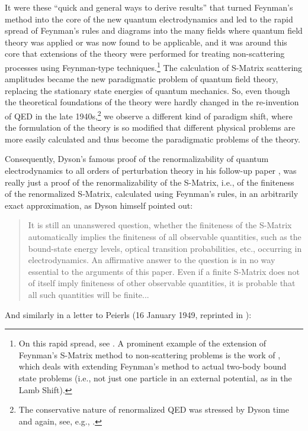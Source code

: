 \documentclass[12pt]{article}
\begin{document}
It were these ``quick and general ways to derive results'' that turned Feynman's method into the core of the new quantum electrodynamics and led to the rapid spread of Feynman's rules and diagrams into the many fields where quantum field theory was applied or was now found to be applicable, and it was around this core that extensions of the theory were performed for treating non-scattering processes using Feynman-type techniques.\footnote{On this rapid spread, see \citep{kaiser}. A prominent example of the extension of Feynman's S-Matrix method to non-scattering problems is the work of \cite{bethe_1951_a-relativistic}, which deals with extending Feynman's method to actual two-body bound state problems (i.e., not just one particle in an external potential, as in the Lamb Shift).} The calculation of S-Matrix scattering amplitudes became the new paradigmatic problem of quantum field theory, replacing the stationary state energies of quantum mechanics. So, even though the theoretical foundations of the theory were hardly changed in the re-invention of QED in the late 1940s,\footnote{The conservative nature of renormalized QED was stressed by Dyson time and again, see, e.g., \citep{dyson_1965_tomonaga}.} we observe a different kind of paradigm shift, where the formulation of the theory is so modified that different physical problems are more easily calculated and thus become the paradigmatic problems of the theory.

Consequently, Dyson's famous proof of the renormalizability of quantum electrodynamics to all orders of perturbation theory in his follow-up paper \citep{dyson_1949_the-s}, was really just a proof of the renormalizability of the S-Matrix, i.e., of the finiteness of the renormalized S-Matrix, calculated using Feynman's rules, in an arbitrarily exact approximation, as Dyson himself pointed out:

\begin{quote}
It is still an unanswered question, whether the finiteness of the S-Matrix automatically implies the finiteness of all observable quantities, such as the bound-state energy levels, optical transition probabilities, etc., occurring in electrodynamics. An affirmative answer to the question is in no way essential to the arguments of this paper. Even if a finite S-Matrix does not of itself imply finiteness of other observable quantities, it is probable that all such quantities will be finite... \citep[p. 1736]{dyson_1949_the-s}
\end{quote}

And similarly in a letter to Peierls (16 January 1949, reprinted in \citep{lee_2009_sir}):
\end{document}
